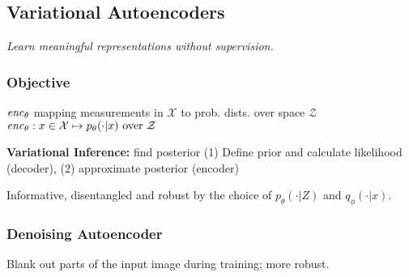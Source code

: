 \subsection{Variational Autoencoders}
\textit{Learn meaningful representations without supervision.}


\subsubsection{Objective}
 $\mathit{enc}_\theta$ mapping measurements in $\mathcal X$ to prob. dists. over space $\mathcal Z$
$
	\mathit{enc}_\theta: x \in \mathcal X \mapsto p_\theta(\cdot| x) \text{ over } \mathcal Z 
$

%



\textbf{Variational Inference: }find posterior (1) Define prior and calculate likelihood (decoder), (2) approximate posterior (encoder)

Informative, disentangled and robust by the choice of $p_\theta(\cdot | Z)$ and $q_\phi(\cdot | x)$.
%
%
%
\subsubsection{Denoising Autoencoder}
Blank out parts of the input image during training; more robust.
